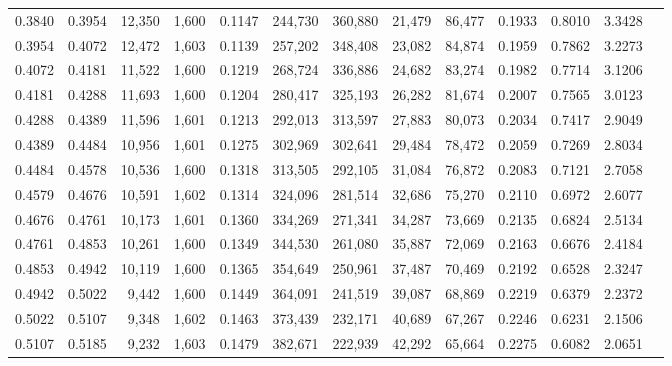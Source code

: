 \begin{tabular}{rrrrrrrrrrrrr}
0.3840 & 0.3954 & 12,350 & 1,600 &                                     0.1147 & 244,730 & 360,880 &  21,479 &  86,477 & 0.1933 & 0.8010 & 3.3428 \\
0.3954 & 0.4072 & 12,472 & 1,603 &                                     0.1139 & 257,202 & 348,408 &  23,082 &  84,874 & 0.1959 & 0.7862 & 3.2273 \\
0.4072 & 0.4181 & 11,522 & 1,600 &                                     0.1219 & 268,724 & 336,886 &  24,682 &  83,274 & 0.1982 & 0.7714 & 3.1206 \\
0.4181 & 0.4288 & 11,693 & 1,600 &                                     0.1204 & 280,417 & 325,193 &  26,282 &  81,674 & 0.2007 & 0.7565 & 3.0123 \\
0.4288 & 0.4389 & 11,596 & 1,601 &                                     0.1213 & 292,013 & 313,597 &  27,883 &  80,073 & 0.2034 & 0.7417 & 2.9049 \\
0.4389 & 0.4484 & 10,956 & 1,601 &                                     0.1275 & 302,969 & 302,641 &  29,484 &  78,472 & 0.2059 & 0.7269 & 2.8034 \\
0.4484 & 0.4578 & 10,536 & 1,600 &                                     0.1318 & 313,505 & 292,105 &  31,084 &  76,872 & 0.2083 & 0.7121 & 2.7058 \\
0.4579 & 0.4676 & 10,591 & 1,602 &                                     0.1314 & 324,096 & 281,514 &  32,686 &  75,270 & 0.2110 & 0.6972 & 2.6077 \\
0.4676 & 0.4761 & 10,173 & 1,601 &                                     0.1360 & 334,269 & 271,341 &  34,287 &  73,669 & 0.2135 & 0.6824 & 2.5134 \\
0.4761 & 0.4853 & 10,261 & 1,600 &                                     0.1349 & 344,530 & 261,080 &  35,887 &  72,069 & 0.2163 & 0.6676 & 2.4184 \\
0.4853 & 0.4942 & 10,119 & 1,600 &                                     0.1365 & 354,649 & 250,961 &  37,487 &  70,469 & 0.2192 & 0.6528 & 2.3247 \\
0.4942 & 0.5022 &  9,442 & 1,600 &                                     0.1449 & 364,091 & 241,519 &  39,087 &  68,869 & 0.2219 & 0.6379 & 2.2372 \\
0.5022 & 0.5107 &  9,348 & 1,602 &                                     0.1463 & 373,439 & 232,171 &  40,689 &  67,267 & 0.2246 & 0.6231 & 2.1506 \\
0.5107 & 0.5185 &  9,232 & 1,603 &                                     0.1479 & 382,671 & 222,939 &  42,292 &  65,664 & 0.2275 & 0.6082 & 2.0651 \\

\end{tabular}

